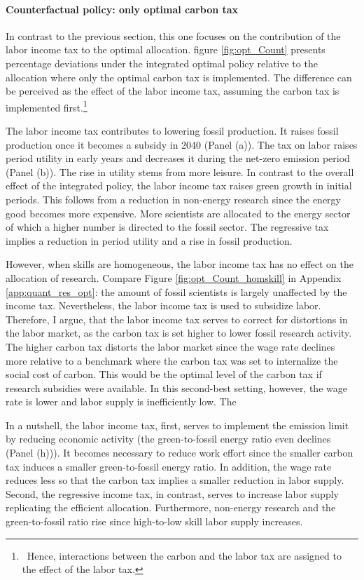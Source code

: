 \paragraph{Counterfactual policy: only optimal carbon tax}
In contrast to the previous section, this one focuses on the contribution of the labor income tax to the optimal allocation.
figure \ref{fig:opt_Count} presents percentage deviations under the integrated optimal policy relative to the allocation where only the optimal carbon tax is implemented. The difference can be perceived as the effect of the labor income tax, assuming the carbon tax is implemented first.\footnote{\ Hence, interactions between the carbon and the labor tax are assigned to the effect of the labor tax.}

 The labor income tax contributes to lowering fossil production. It raises fossil production once it becomes a subsidy in 2040 (Panel (a)). The tax on labor raises period utility in early years and decreases it during the net-zero emission period (Panel (b)). The rise in utility stems from more leisure. In contrast to the overall effect of the integrated policy, the labor income tax raises green growth in initial periods. This follows from a reduction in non-energy research since the energy good becomes more expensive. More scientists are allocated to the energy sector of which a higher number is directed to the fossil sector. The regressive tax implies a reduction in period utility and a rise in fossil production.
 
 However, when skills are homogeneous, the labor income tax has no effect on the allocation of research. Compare Figure \ref{fig:opt_Count_homskill} in Appendix \ref{app:quant_res_opt}: the amount of fossil scientists is largely unaffected by the income tax. Nevertheless, the labor income tax is used to subsidize labor. Therefore, I argue, that the labor income tax serves to correct for distortions in the labor market, as the carbon tax is set higher to lower fossil  research activity. The higher carbon tax distorts the labor market since the wage rate declines more relative to a benchmark where the carbon tax was set to internalize the social cost of carbon. This would be the optimal level of the carbon tax if research subsidies were available. In this second-best setting, however, the wage rate is lower and labor supply is inefficiently low. The 
 
 In a nutshell, the labor income tax, first, serves to implement the emission limit by reducing economic activity (the green-to-fossil energy ratio even declines (Panel (h))). It becomes necessary to reduce work effort since the smaller carbon tax induces a smaller green-to-fossil energy ratio. In addition, the wage rate reduces less so that the carbon tax implies a smaller reduction in labor supply. Second, the regressive income tax, in contrast, serves to increase labor supply replicating the efficient allocation. Furthermore, non-energy research and the green-to-fossil ratio rise since high-to-low skill labor supply increases. 
 
   
\clearpage